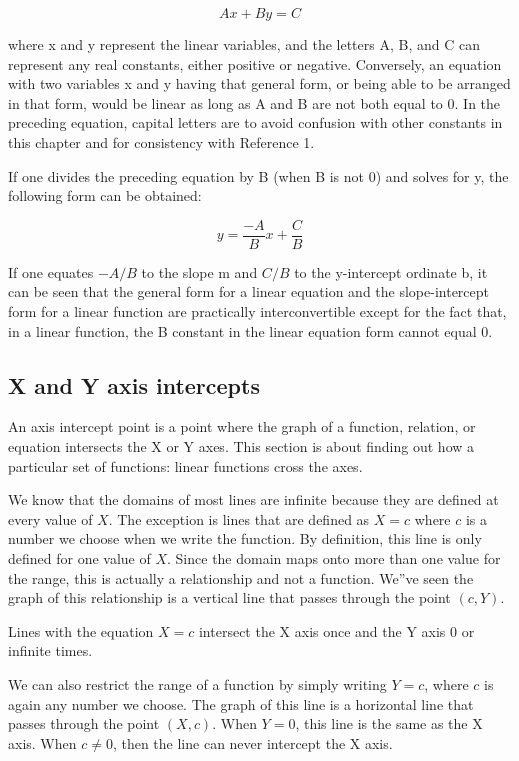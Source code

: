 \[
A x + B y = C
\]

where x and y represent the linear variables, and the letters A, B, and C can represent
any real constants, either positive or negative. Conversely, an equation with two
variables x and y having that general form, or being able to be arranged in that form,
would be linear as long as A and B are not both equal to 0. In the preceding equation,
capital letters are to avoid confusion with other constants in this chapter and for
consistency with Reference 1.

If one divides the preceding equation by B (when B is not 0) and solves for y, the
following form can be obtained:

\[
y = \frac{-A}{B} x + \frac{C}{B}
\]

If one equates $-A/B$ to the slope m and $C/B$ to the y-intercept ordinate b, it can be seen that the general form for a linear equation and the slope-intercept form for a linear function are practically interconvertible except for the fact that, in a linear function, the B constant in the linear equation form cannot equal 0.

\subsection{X and Y axis intercepts}
\label{sss:xand-5717}

An axis intercept point is a point where the graph of a function, relation, or equation
intersects the X or Y axes. This section is about finding out how a particular set of
functions: linear functions cross the axes.

We know that the domains of most lines are infinite because they are defined at every value of $X$. The exception is lines that are defined as $X = c$ where $c$ is a number we choose when we write the function. By definition, this line is only defined for one value of $X$. Since the domain maps onto more than one value for the range, this is actually a relationship and not a function. We''ve seen the graph of this relationship is a vertical line that passes through the point $(c,Y)$.

Lines with the equation $X = c$ intersect the X axis once and the Y axis 0 or infinite times.

We can also restrict the range of a function by simply writing $Y = c$, where $c$ is again any number we choose. The graph of this line is a horizontal line that passes through the point $(X, c)$. When $Y = 0$, this line is the same as the X axis. When $c \neq 0$, then the line can never intercept the X axis.


